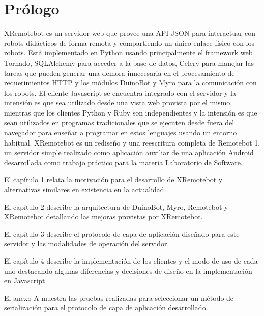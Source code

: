 \chapter*{Prólogo}\label{prologo}

XRemotebot es un servidor web que provee una API JSON para interactuar
con robots didácticos de forma remota y compartiendo un único enlace
físico con los robots. Está implementado en Python usando principalmente el
framework web Tornado, SQLAlchemy para acceder a la base de datos, Celery
para manejar las tareas que pueden generar una demora innecesaria en el
procesamiento de requerimientos HTTP y los módulos DuinoBot y Myro para
la comunicación con los robots. El cliente Javascript se encuentra
integrado con el servidor y la intensión es que sea utilizado desde una
vista web provista por el mismo, mientras que los clientes Python y Ruby
son independientes y la intensión es que sean utilizados en programas
tradicionales que se ejecuten desde fuera del navegador para enseñar
a programar en estos lenguajes usando un entorno habitual. XRemotebot
es un rediseño y una reescritura completa de Remotebot 1, un servidor
simple realizado como aplicación auxiliar de una aplicación Android
desarrollada
como trabajo práctico para la materia Laboratorio de Software.

El capítulo 1 relata la motivación para el desarrollo de XRemotebot
y alternativas similares en existencia en la actualidad.

El capítulo 2 describe la arquitectura de DuinoBot, Myro, Remotebot y
XRemotebot detallando las mejoras provistas por XRemotebot.

El capítulo 3 describe el protocolo de capa de aplicación diseñado para
este servidor y las modalidades de operación del servidor.

El capítulo 4 describe la implementación de los clientes y el modo de uso
de cada uno destacando algunas diferencias y decisiones de diseño en la
implementación en Javascript.

El anexo A muestra las pruebas realizadas para seleccionar un método
de serialización para el protocolo de capa de aplicación desarrollado.


